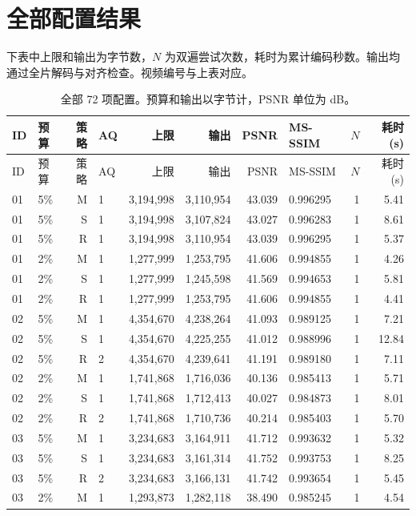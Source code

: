 \documentclass[UTF8,10pt,a4paper]{ctexart}
\begin{document}
\section{全部配置结果}
下表中上限和输出为字节数，$N$ 为双遍尝试次数，耗时为累计编码秒数。输出均通过全片解码与对齐检查。视频编号与上表对应。
\small
\begin{longtable}{llrlrrrlrr}
\caption{全部 72 项配置。预算和输出以字节计，PSNR 单位为 dB。}\\
\toprule ID & 预算 & 策略 & AQ & 上限 & 输出 & PSNR & MS-SSIM & $N$ & 耗时(s)\\\midrule\endfirsthead
\toprule ID & 预算 & 策略 & AQ & 上限 & 输出 & PSNR & MS-SSIM & $N$ & 耗时(s)\\\midrule\endhead
01 & 5\% & M & 1 & 3,194,998 & 3,110,954 & 43.039 & 0.996295 & 1 & 5.41 \\
01 & 5\% & S & 1 & 3,194,998 & 3,107,824 & 43.027 & 0.996283 & 1 & 8.61 \\
01 & 5\% & R & 1 & 3,194,998 & 3,110,954 & 43.039 & 0.996295 & 1 & 5.37 \\
01 & 2\% & M & 1 & 1,277,999 & 1,253,795 & 41.606 & 0.994855 & 1 & 4.26 \\
01 & 2\% & S & 1 & 1,277,999 & 1,245,598 & 41.569 & 0.994653 & 1 & 5.81 \\
01 & 2\% & R & 1 & 1,277,999 & 1,253,795 & 41.606 & 0.994855 & 1 & 4.41 \\
02 & 5\% & M & 1 & 4,354,670 & 4,238,264 & 41.093 & 0.989125 & 1 & 7.21 \\
02 & 5\% & S & 1 & 4,354,670 & 4,225,255 & 41.012 & 0.988996 & 1 & 12.84 \\
02 & 5\% & R & 2 & 4,354,670 & 4,239,641 & 41.191 & 0.989180 & 1 & 7.11 \\
02 & 2\% & M & 1 & 1,741,868 & 1,716,036 & 40.136 & 0.985413 & 1 & 5.71 \\
02 & 2\% & S & 1 & 1,741,868 & 1,712,413 & 40.027 & 0.984873 & 1 & 8.01 \\
02 & 2\% & R & 2 & 1,741,868 & 1,710,736 & 40.214 & 0.985403 & 1 & 5.70 \\
03 & 5\% & M & 1 & 3,234,683 & 3,164,911 & 41.712 & 0.993632 & 1 & 5.32 \\
03 & 5\% & S & 1 & 3,234,683 & 3,161,314 & 41.752 & 0.993753 & 1 & 8.25 \\
03 & 5\% & R & 2 & 3,234,683 & 3,166,131 & 41.742 & 0.993654 & 1 & 5.45 \\
03 & 2\% & M & 1 & 1,293,873 & 1,282,118 & 38.490 & 0.985245 & 1 & 4.54 \\

\end{longtable}
\end{document}
